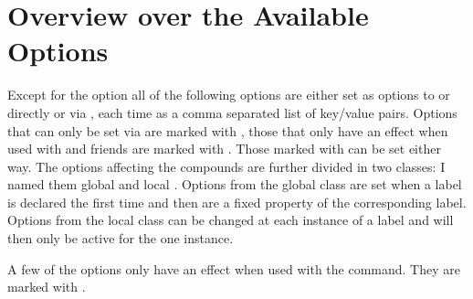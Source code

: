 \documentclass[load-preamble+,babel-options={ngerman,british,american}]{cnltx-doc}
\begin{document}
\section{Overview over the Available Options}\label{sec:overv-over-avail-1}
Except for the  option all of the following options are either
set as options to  or  directly or via
, each time as a comma separated list of
key/value pairs.  Options that can only be set via  are marked
with , those that only have an effect when used with  and
friends are marked with .  Those marked with  can
be set either way.  The options affecting the compounds are further divided in
two classes: I named them global  and local . Options
from the global class are set when a label is declared the first time and then
are a fixed property of the corresponding label.  Options from the local class
can be changed at each instance of a label and will then only be active for
the one instance.

A few of the options only have an effect when used with the 
command.  They are marked with .
\end{document}
